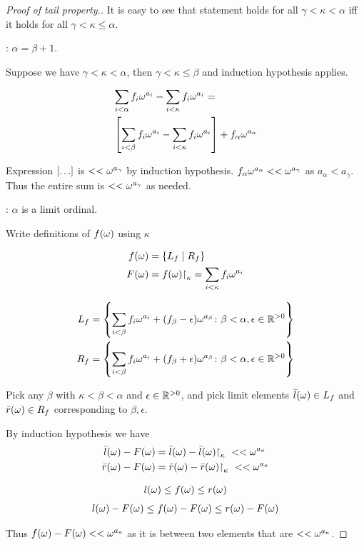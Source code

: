 \begin{proof}[Proof of tail property.] %

It is easy to see that statement holds for all $\gamma < \kappa < \alpha$ iff it holds for all $\gamma < \kappa \leq \alpha$.

: $\alpha = \beta + 1$.

Suppose we have $\gamma < \kappa < \alpha$, then $\gamma < \kappa \leq \beta$ and induction hypothesis applies.

\begin{align*}
	&\sum_{i < \alpha} f_i \omega^{a_i} - \sum_{i < \kappa} f_i \omega^{a_i} = \\
	&\left[ \sum_{i < \beta} f_i \omega^{a_i} - \sum_{i < \kappa} f_i \omega^{a_i} \right] + f_\alpha \omega^{a_\alpha}
\end{align*}

Expression $\left[ \ldots \right]$ is $<< \omega^{a_\gamma}$ by induction hypothesis. $f_\alpha \omega^{a_\alpha} << \omega^{a_\gamma}$ as $a_\alpha < a_\gamma$. Thus the entire sum is $<< \omega^{a_\gamma}$ as needed.

: $\alpha$ is a limit ordinal.

Write definitions of $f(\omega)$ using $\kappa$

\begin{align*}
  f(\omega) &= \left\{ L_f \mid R_f \right\} \\
  F(\omega) &= f(\omega)\mathord{\upharpoonright}_{\kappa} = \sum_{i < \kappa} f_i \omega^{a_i}
\end{align*}

\begin{align*}
  L_f &= \left\{ \sum_{i < \beta} f_i \omega^{a_i} + (f_\beta - \epsilon) \omega^{a_\beta}
	\colon \beta < \alpha, \epsilon \in \mathbb{R}^{>0} \right\} \\
  R_f &= \left\{ \sum_{i < \beta} f_i \omega^{a_i} + (f_\beta + \epsilon) \omega^{a_\beta}
	\colon \beta < \alpha, \epsilon \in \mathbb{R}^{>0} \right\} \\
\end{align*}

Pick any $\beta$ with $\kappa < \beta < \alpha$ and $\epsilon \in \mathbb{R}^{>0}$,
and pick limit elements $\bar l(\omega) \in L_f$ and $\bar r(\omega) \in R_f$ corresponding to $\beta, \epsilon$.

By induction hypothesis we have 
\begin{align*}
	\bar l(\w) - F(\w) &= \bar l(\w) - \bar l(\w)\midr\kappa \ <<  \w^{a_\kappa} \\
	\bar r(\w) - F(\w) &= \bar r(\w) - \bar r(\w)\midr\kappa \ <<  \w^{a_\kappa}
\end{align*}

\begin{align*}
	l(\omega) \leq f(\omega) \leq r(\omega) \\
\end{align*}
\begin{align*}
	l(\omega) - F(\omega) \leq f(\omega) - F(\omega) \leq r(\omega) - F(\omega)
\end{align*}
 
Thus $f(\omega) - F(\omega) << \omega^{a_\kappa}$ as it is between two elements that are $<<  \omega^{a_\kappa}$.

\end{proof}

